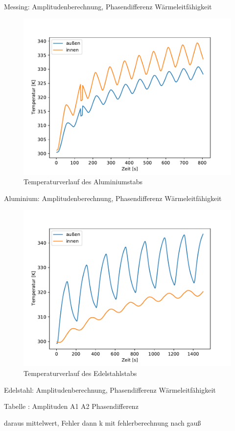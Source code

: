 Messing: Amplitudenberechnung, Phasendifferenz
Wärmeleitfähigkeit

\begin{figure}[!htbp]
  \centering
  \includegraphics{content/dyn_80_alu.pdf}
  \caption{Temperaturverlauf des Aluminiumstabs}
  \label{fig:alu_dyn}
\end{figure}

Aluminium: Amplitudenberechnung, Phasendifferenz
Wärmeleitfähigkeit



\begin{figure}[!htbp]
  \centering
  \includegraphics{content/dyn_2.pdf}
  \caption{Temperaturverlauf des Edelstahlstabs}
  \label{fig:edel_dyn}
\end{figure}

Edelstahl: Amplitudenberechnung, Phasendifferenz
Wärmeleitfähigkeit

Tabelle : Amplituden A1 A2 Phasendifferenz

daraus mittelwert, Fehler
dann k mit fehlerberechnung nach gauß

